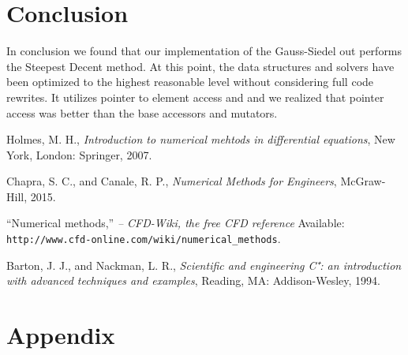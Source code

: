 \documentclass[]{aiaa-tc}%
\begin{document}
\begin{figure}[htb]
\begin{subfigmatrix}{2}
  \end{subfigmatrix}
 \label{f:p_convergeplot}
\end{figure}

\FloatBarrier\section{Conclusion}
In conclusion we found that our implementation of the Gauss-Siedel out performs the Steepest Decent method. At this point, the data structures and solvers have been optimized to the highest reasonable level without considering full code rewrites. It utilizes pointer to element access and and we realized that pointer access was better than the base accessors and mutators.


\begin{thebibliography}{9}%
 Holmes, M. H., {\it Introduction to numerical mehtods in differential equations}, New York, London: Springer, 2007.

Chapra, S. C., and Canale, R. P., {\it Numerical Methods for Engineers}, McGraw-Hill, 2015.

“Numerical methods,” {\it -- CFD-Wiki, the free CFD reference} Available: \verb+http://www.cfd-online.com/wiki/numerical_methods+.

Barton, J. J., and Nackman, L. R., {\it Scientific and engineering C⁺: an introduction with advanced techniques and examples}, Reading, MA: Addison-Wesley, 1994.

\end{thebibliography}

\section*{Appendix}




\end{document}

